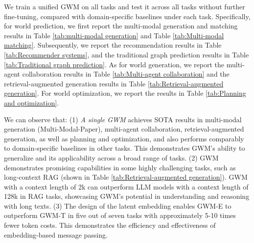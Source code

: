 We train a unified GWM on all tasks and test it across all tasks without further fine-tuning, compared with domain-specific baselines under each task. Specifically, for world prediction, we first report the multi-modal generation and matching results  in Table \ref{tab:multi-modal generation} and  Table \ref{tab:Multi-modal matching}. Subsequently, we report the recommendation results in Table \ref{tab:Recommender systems}, and the traditional graph prediction results in Table \ref{tab:Traditional graph prediction}. As for world generation, we report the multi-agent collaboration results in Table \ref{tab:Multi-agent collaboration} and the retrieval-augmented generation results in Table \ref{tab:Retrieval-augmented generation}. For world optimization, we report the results in Table \ref{tab:Planning and optimization}.

We can observe that: (1) \textit{A single GWM} achieves SOTA results in multi-modal generation (Multi-Modal-Paper), multi-agent collaboration, retrieval-augmented generation, as well as planning and optimization, and also performs comparably to domain-specific baselines in other tasks. This demonstrates GWM's ability to generalize and its applicability across a broad range of tasks. (2) GWM demonstrates promising capabilities in some highly challenging tasks, such as long-context RAG (shown in Table \ref{tab:Retrieval-augmented generation}). GWM with a context length of 2k can outperform LLM models with a context length of 128k in RAG tasks, showcasing GWM's potential in understanding and reasoning with long texts. (3) The design of the latent embedding enables GWM-E to outperform GWM-T in five out of seven tasks with approximately 5-10 times fewer token costs. This demonstrates the efficiency and effectiveness of embedding-based message passing.






